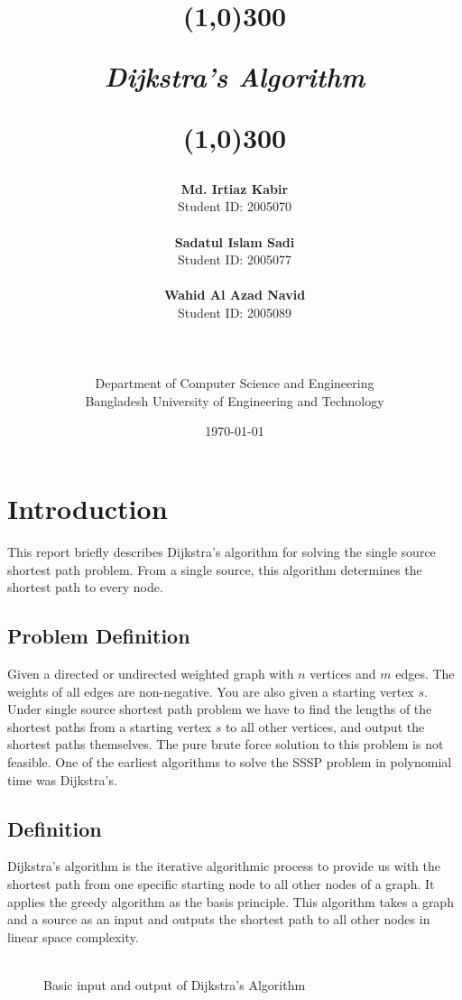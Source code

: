 \documentclass[12pt, a4paper]{article}
\title{
	\line(1,0){300}
	\endgraf\bigskip
	\Huge
	\begin{center}
		\emph{\Large{\textbf{Dijkstra's Algorithm}}}
	\end{center}
	\line(1,0){300}
	\bigskip
	\bigskip
}
\author{
	\textbf{Md. Irtiaz Kabir}\\Student ID: 2005070\\\\
	\textbf{Sadatul Islam Sadi}\\Student ID: 2005077\\\\
        \textbf{Wahid Al Azad Navid}\\Student ID: 2005089\\\\\\\\
	Department of Computer Science and Engineering\\
    Bangladesh University of Engineering and Technology\\
}
\date{
	\endgraf\bigskip
	{\today}
}
\begin{document}
    \maketitle
    \pagebreak
    \tableofcontents
    \pagebreak
    \listoffigures
    \pagebreak
    \listoftables
    \pagebreak
    \section{Introduction}
    This report briefly describes Dijkstra's algorithm for solving the single source shortest path problem. From a single source, this algorithm determines the shortest path to every node.
    \subsection{Problem Definition}
    Given a directed or undirected weighted graph with $n$ vertices and $m$ edges. The weights of all edges are non-negative. You are also given a starting vertex $s$. Under single source shortest path problem we have to find the lengths of the shortest paths from a starting vertex $s$ to all other vertices, and output the shortest paths themselves. The pure brute force solution to this problem is not feasible. One of the earliest algorithms to solve the SSSP problem in polynomial time was Dijkstra's.
    \subsection{Definition}
    Dijkstra’s algorithm is the iterative algorithmic process to provide us with the shortest path from one specific starting node to all other nodes of a graph. It applies the greedy algorithm as the basis principle. This algorithm takes a graph and a source as an input and outputs the shortest path to all other nodes in linear space complexity.
    \\\\
    \begin{figure}[h]
        \centering
        \caption{Basic input and output of Dijkstra's Algorithm}
    \end{figure}
    \pagebreak
\end{document}
